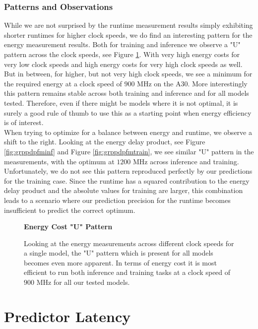 \FloatBarrier

\subsubsection{Patterns and Observations}
While we are not surprised by the runtime measurement results simply exhibiting shorter runtimes for higher clock speeds, we do find an interesting pattern for the energy measurement results. Both for training and inference we observe a "U" pattern across the clock speeds, see Figure \ref{fig:pattern}. With very high energy costs for very low clock speeds and high energy costs for very high clock speeds as well. But in between, for higher, but not very high clock speeds, we see a minimum for the required energy at a clock speed of $900$ MHz on the A30. More interestingly this pattern remains stable across both training and inference and for all models tested. Therefore, even if there might be models where it is not optimal, it is surely a good rule of thumb to use this as a starting point when energy efficiency is of interest. \\
When trying to optimize for a balance between energy and runtime, we observe a shift to the right. Looking at the energy delay product, see Figure \ref{fig:grppdpfminf} and Figure \ref{fig:grppdpfmtrain}, we see similar "U" pattern in the measurements, with the optimum at $1200$ MHz across inference and training. \\
Unfortunately, we do not see this pattern reproduced perfectly by our predictions for the training case. Since the runtime has a squared contribution to the energy delay product and the absolute values for training are larger, this combination leads to a scenario where our prediction precision for the runtime becomes insufficient to predict the correct optimum. 


\begin{figure}[htbp]
    \centering
    \parbox{0.7\textwidth}{\centering\textbf{Energy Cost "U" Pattern}}
    \caption{Looking at the energy measurements across different clock speeds for a single model, the "U" pattern which is present for all models becomes even more apparent. In terms of energy cost it is most efficient to run both inference and training tasks at a clock speed of $900$ MHz for all our tested models.}
    \label{fig:pattern}
\end{figure}

\section{Predictor Latency}


